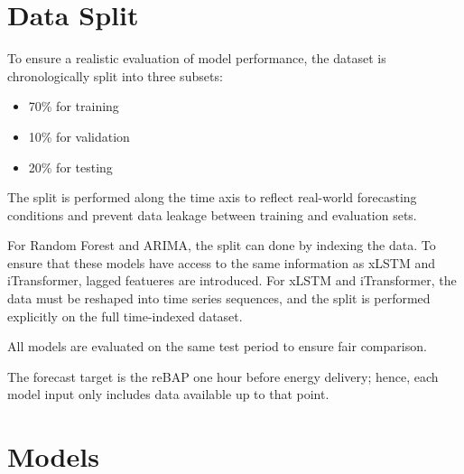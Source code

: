 \documentclass[class=scrbook, crop=false]{standalone}
\begin{document}
\section{Data Split}
\label{Section::Data_Split}
To ensure a realistic evaluation of model performance, the dataset is chronologically split into three subsets:
\begin{itemize}
\item 70\% for training
\item 10\% for validation
\item 20\% for testing
\end{itemize}

The split is performed along the time axis to reflect real-world forecasting conditions and prevent data leakage between training and evaluation sets.

For Random Forest and ARIMA, the split can done by indexing the data. To ensure that these models have access to the same information as xLSTM and iTransformer, lagged featueres are introduced. For xLSTM and iTransformer, the data must be reshaped into time series sequences, and the split is performed explicitly on the full time-indexed dataset.

All models are evaluated on the same test period to ensure fair comparison. 

The forecast target is the reBAP one hour before energy delivery; hence, each model input only includes data available up to that point.






\section{Models}
\label{Section::Models}
\end{document}
